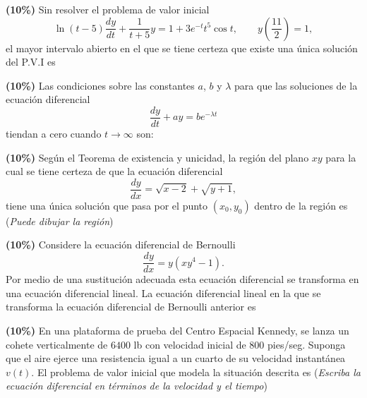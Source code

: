 \documentclass[11pt]{article}
\begin{document}
\begin{opciones}
\item[a)] \textbf{(10\%)} Sin resolver el problema de valor inicial
\[
\ln(t-5)\frac{dy}{dt}+\frac{1}{t+5}y=1+3e^{-t}t^5\cos t, \qquad y\left(\frac{11}{2}\right)=1,
\]
el mayor intervalo abierto en el que se tiene certeza que existe una única solución del P.V.I es \underline{\hspace{3cm}}

\item[b)] \textbf{(10\%)} Las condiciones sobre las constantes $a$, $b$ y $\lambda$ para que las soluciones de la ecuación diferencial
\[
\frac{dy}{dt}+ay=be^{-\lambda t}
\]
tiendan a cero cuando $t\to\infty$ son: \underline{\hspace{5cm}}

\item[c)] \textbf{(10\%)} Según el Teorema de existencia y unicidad, la región del plano $xy$ para la cual se tiene certeza de que la ecuación diferencial
\[
\frac{dy}{dx}=\sqrt{x-2}+\sqrt{y+1},
\]
tiene una única solución que pasa por el punto $(x_0,y_0)$ dentro de la región es \underline{\hspace{3cm}} (\textit{Puede dibujar la región})

\begin{center}
\end{center}

\item[d)] \textbf{(10\%)} Considere la ecuación diferencial de Bernoulli
\[
\frac{dy}{dx}=y(xy^4-1).
\]
Por medio de una sustitución adecuada esta ecuación diferencial se transforma en una ecuación diferencial lineal. La ecuación diferencial lineal en la que se transforma la ecuación diferencial de Bernoulli anterior es \underline{\hspace{5cm}}

\item[e)] \textbf{(10\%)} En una plataforma de prueba del Centro Espacial Kennedy, se lanza un cohete verticalmente de $6400$ lb con velocidad inicial de $800$ pies/seg. Suponga que el aire ejerce una resistencia igual a un cuarto de su velocidad instantánea $v(t)$. El problema de valor inicial que modela la situación descrita es \underline{\hspace{5cm}} (\textit{Escriba la ecuación diferencial en términos de la velocidad y el tiempo})
\end{opciones}
\end{document}

